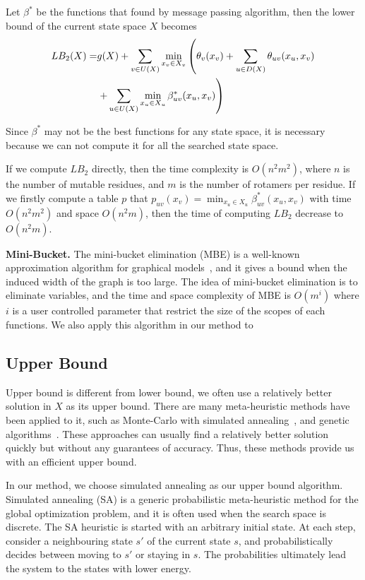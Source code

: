 Let $\beta^*$ be the functions that found by message passing algorithm, then the lower bound of the current state space $X$ becomes
\begin{align}
LB_2(X)=&g(X)+\sum_{v\in U(X)}\min_{x_v\in X_v}\left(\theta_v(x_v)+\sum_{u\in D(X)}\theta_{uv}(x_u,x_v)\right. \notag \\
&\left.+\sum_{u\in U(X)}\min_{x_u\in X_u}\beta_{uv}^*(x_u,x_v)\right)
\end{align}

Since $\beta^*$ may not be the best functions for any state space, it is necessary because we can not compute it for all the searched state space.

If we compute $LB_2$ directly, then the time complexity is $O(n^2m^2)$, where $n$ is the number of mutable residues, and $m$ is the number of rotamers per residue. If we firstly compute a table $p$ that $p_{uv}(x_v)=\min_{x_u\in X_u}\beta_{uv}^*(x_u,x_v)$ with time $O(n^2m^2)$ and space $O(n^2m)$, then the time of computing $LB_2$ decrease to $O(n^2m)$.

\noindent\textbf{Mini-Bucket.} The mini-bucket elimination (MBE) is a well-known approximation algorithm for graphical models~\cite[]{dechter2003mini, rollon2010evaluating, rollon2006mini}, and it gives a bound when the induced width of the graph is too large. The idea of mini-bucket elimination is to eliminate variables, and the time and space complexity of MBE is $O(m^i)$ where $i$ is a user controlled parameter that restrict the size of the scopes of each functions. We also apply this algorithm in our method to

\subsection{Upper Bound}
Upper bound is different from lower bound, we often use a relatively better solution in $X$ as its upper bound. There are many meta-heuristic methods have been applied to it, such as Monte-Carlo with simulated annealing~\cite[]{kuhlman2000native, voigt2000trading}, and genetic algorithms~\cite[]{raha2000prediction}. These approaches can usually find a relatively better solution quickly but without any guarantees of accuracy. Thus, these methods provide us with an efficient upper bound.

In our method, we choose simulated annealing as our upper bound algorithm. Simulated annealing (SA) is a generic probabilistic meta-heuristic method for the global optimization problem, and it is often used when the search space is discrete. The SA heuristic is started with an arbitrary initial state. At each step, consider a neighbouring state $s'$ of the current state $s$, and probabilistically decides between moving to $s'$ or staying in $s$. The probabilities ultimately lead the system to the states with lower energy.


